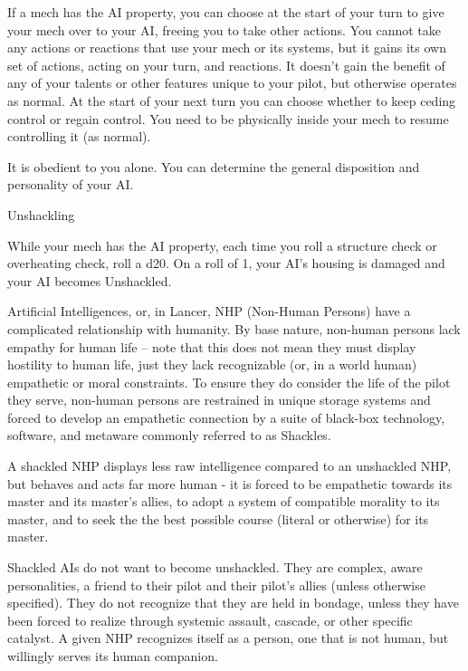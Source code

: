 If a mech has the AI property, you can choose at the start of your turn to give your mech over to
your AI, freeing you to take other actions. You cannot take any actions or reactions that use your
mech or its systems, but it gains its own set of actions, acting on your turn, and reactions. It
doesn’t gain the benefit of any of your talents or other features unique to your pilot, but
otherwise operates as normal. At the start of your next turn you can choose whether to keep
ceding control or regain control. You need to be physically inside your mech to resume
controlling it (as normal).


It is obedient to you alone. You can determine the general disposition and personality of your AI.


                                                 Unshackling




While your mech has the AI property, each time you roll a structure check or overheating
check, roll a d20. On a roll of 1, your AI’s housing is damaged and your AI becomes Unshackled.


Artificial Intelligences, or, in Lancer, NHP (Non-Human Persons) have a complicated relationship
with humanity. By base nature, non-human persons lack empathy for human life -- note that this
does not mean they must display hostility to human life, just they lack recognizable (or, in a world
human) empathetic or moral constraints. To ensure they do consider the life of the pilot they
serve, non-human persons are restrained in unique storage systems and forced to develop an
empathetic connection by a suite of black-box technology, software, and metaware commonly
referred to as Shackles.


A shackled NHP displays less raw intelligence compared to an unshackled NHP, but behaves
and acts far more human - it is forced to be empathetic towards its master and its master’s allies,
to adopt a system of compatible morality to its master, and to seek the the best possible course
(literal or otherwise) for its master.


Shackled AIs do not want to become unshackled. They are complex, aware personalities, a
friend to their pilot and their pilot’s allies (unless otherwise specified). They do not recognize that
they are held in bondage, unless they have been forced to realize through systemic assault,
cascade, or other specific catalyst. A given NHP recognizes itself as a person, one that is not
human, but willingly serves its human companion.


